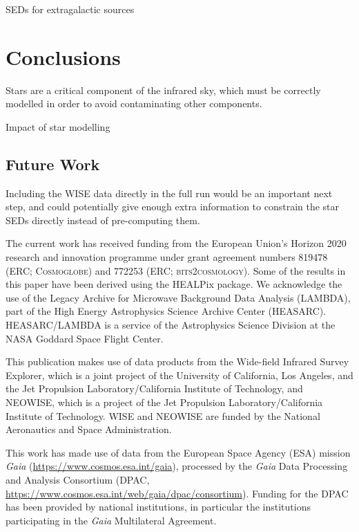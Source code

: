 \documentclass{aa}
\begin{document}
SEDs for extragalactic sources


\section{Conclusions}
\label{sec:conclusions}

Stars are a critical component of the infrared sky, which must be correctly modelled in order to avoid contaminating other components. 

Impact of star modelling

\subsection{Future Work}

Including the WISE data directly in the full run would be an important next step, and could potentially give enough extra information to constrain the star SEDs directly instead of pre-computing them. 




\begin{acknowledgements}
 The current work has received funding from the European
  Union’s Horizon 2020 research and innovation programme under grant
  agreement numbers 819478 (ERC; \textsc{Cosmoglobe}) and 772253 (ERC;
  \textsc{bits2cosmology}). Some of the results in this paper have been derived using the HEALPix \citep{HEALPIX} package.
  We acknowledge the use of the Legacy Archive for Microwave Background Data
  Analysis (LAMBDA), part of the High Energy Astrophysics Science Archive Center
  (HEASARC). HEASARC/LAMBDA is a service of the Astrophysics Science Division at
  the NASA Goddard Space Flight Center.  
  
   This publication makes use of data products from the Wide-field Infrared Survey Explorer, which is a joint project of the University of California, Los Angeles, and the Jet Propulsion Laboratory/California Institute of Technology, and NEOWISE, which is a project of the Jet Propulsion Laboratory/California Institute of Technology. WISE and NEOWISE are funded by the National Aeronautics and Space Administration.
   
   This work has made use of data from the European Space Agency (ESA) mission
{\it Gaia} (\url{https://www.cosmos.esa.int/gaia}), processed by the {\it Gaia}
Data Processing and Analysis Consortium (DPAC,
\url{https://www.cosmos.esa.int/web/gaia/dpac/consortium}). Funding for the DPAC
has been provided by national institutions, in particular the institutions
participating in the {\it Gaia} Multilateral Agreement.
\end{acknowledgements}


%



\end{document}
